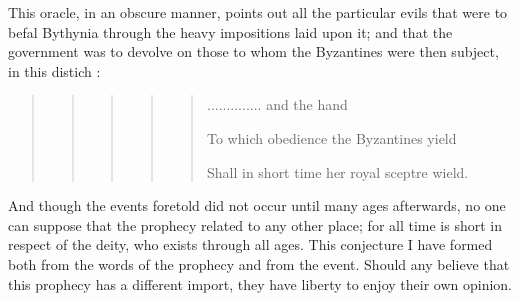 This oracle, in an obscure manner, points out all the particular evils that were to befal Bythynia through the heavy impositions laid upon it; and that the government was to devolve on those to whom the Byzantines were then subject, in this distich :

\begin{quote}

\begin{quote}

\begin{quote}

\begin{quote}

\begin{quote}

.............. and the hand

To which obedience the Byzantines yield 

Shall in short time her royal sceptre wield.

\end{quote}

\end{quote}

\end{quote}

\end{quote}

\end{quote}

And though the events foretold did not occur until many ages afterwards, no one can suppose that the prophecy related to any other place; for all time is short in respect of the deity, who exists through all ages. This conjecture I have formed both from the words of the prophecy and from the event. Should any believe that this prophecy has a different import, they have liberty to enjoy their own opinion.

